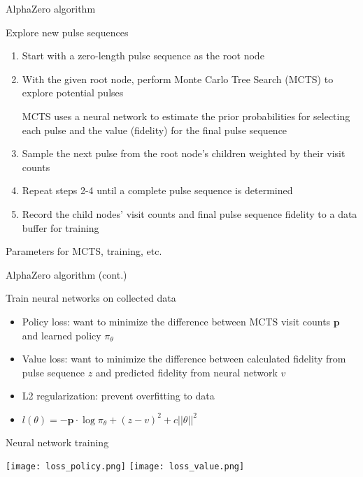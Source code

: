 \documentclass{beamer}
\begin{document}
\begin{frame}{AlphaZero algorithm}


Explore new pulse sequences

\begin{enumerate}

\item
Start with a zero-length pulse sequence as the root node
\item
With the given root node, perform Monte Carlo Tree Search (MCTS) to
explore potential pulses

MCTS uses a neural network to estimate the prior probabilities for
selecting each pulse and the value (fidelity) for the final pulse
sequence

\item
Sample the next pulse from the root node's children weighted by
their visit counts
\item
Repeat steps 2-4 until a complete pulse sequence is determined
\item
Record the child nodes' visit counts and final pulse sequence
fidelity to a data buffer for training
\end{enumerate}

Parameters for MCTS, training, etc.
\end{frame}

\begin{frame}{AlphaZero algorithm (cont.)}

Train neural networks on collected data

\begin{itemize}

\item
Policy loss: want to minimize the difference between MCTS visit
counts \(\mathbf{p}\) and learned policy \(\pi_\theta\)
\item
Value loss: want to minimize the difference between calculated
fidelity from pulse sequence \(z\) and predicted fidelity from
neural network \(v\)
\item
L2 regularization: prevent overfitting to data
\item
\(l(\theta) = -\mathbf{p} \cdot \log\pi_\theta + (z - v)^2 + c||\theta||^2\)
\end{itemize}
\end{frame}


\begin{frame}{Neural network training}

\texttt{[image: loss\_policy.png]}
\texttt{[image: loss\_value.png]}
\end{frame}
\end{document}
